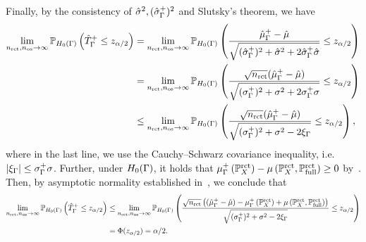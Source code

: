 Finally, by the consistency of $\hat{\sigma}^2, (\hat{\sigma}^+_\Gamma)^2$ and Slutsky's theorem, we have
\begin{align*}
\lim_{n_{\operatorname{rct}},n_{\operatorname{os}} \to \infty} \mathbb P_{H_0(\Gamma)} \left(\hat{T}_\Gamma^+  \leq z_{\alpha/2} \right)&= \lim_{n_{\operatorname{rct}},n_{\operatorname{os}} \to \infty} \mathbb P_{H_0(\Gamma)}\left(\frac{\hat{\mu}^{+}_\Gamma - \hat{\mu} }{\sqrt{(\hat{\sigma}^+_\Gamma)^2 + \hat{\sigma}^2 +2\hat{\sigma}^+_\Gamma\hat{\sigma}} }  \leq z_{\alpha/2} \right)\\
&=\lim_{n_{\operatorname{rct}},n_{\operatorname{os}} \to \infty} \mathbb P_{H_0(\Gamma)}\left(\frac{\sqrt{n_{\operatorname{rct}}}(\hat{\mu}^{+}_\Gamma - \hat{\mu})}{\sqrt{(\sigma^+_\Gamma)^2 + \sigma^2 +2\sigma^+_\Gamma \sigma} }  \leq z_{\alpha/2} \right) \\ 
&\leq \lim_{n_{\operatorname{rct}},n_{\operatorname{os}} \to \infty} \mathbb P_{H_0(\Gamma)}\left(\frac{\sqrt{n_{\operatorname{rct}}}(\hat{\mu}^{+}_\Gamma - \hat{\mu})}{\sqrt{(\sigma^+_\Gamma)^2 + \sigma^2-2\xi_\Gamma} }  \leq z_{\alpha/2} \right),
\end{align*}
where in the last line, we use the Cauchy--Schwarz covariance inequality, i.e. $|\xi_\Gamma| \leq \sigma^+_\Gamma\sigma$. Further, under $H_0(\Gamma)$, it holds that $\mu_\Gamma^+\left(\mathbb{P}^{\operatorname{rct}}_X\right) -\mu\left(\mathbb{P}^{\operatorname{rct}}_X, \mathbb{P} ^{\operatorname{rct}}_{\operatorname{full}} \right)\geq 0$ by~. Then, by asymptotic normality established in~, we conclude that
\begin{align*}
\lim_{n_{\operatorname{rct}},n_{\operatorname{os}} \to \infty} \mathbb P_{H_0(\Gamma)}\left(\hat{T}_\Gamma^+  \leq z_{\alpha/2} \right)&\leq \lim_{n_{\operatorname{rct}},n_{\operatorname{os}}  \to \infty} \mathbb P_{H_0(\Gamma)} \left(\frac{\sqrt{n_{\operatorname{rct}}}\left((\hat{\mu}^{+}_\Gamma - \hat{\mu}) -\mu_\Gamma^+\left(\mathbb{P}^{\operatorname{rct}}_X\right) +\mu\left(\mathbb{P}^{\operatorname{rct}}_X, \mathbb{P} ^{\operatorname{rct}}_{\operatorname{full}} \right)\right)}{\sqrt{(\sigma_\Gamma^+)^2 + \sigma^2-2\xi_\Gamma} }  \leq z_{\alpha/2} \right) \\
&= \Phi(z_{\alpha/2})=\alpha/2. 
\end{align*}






